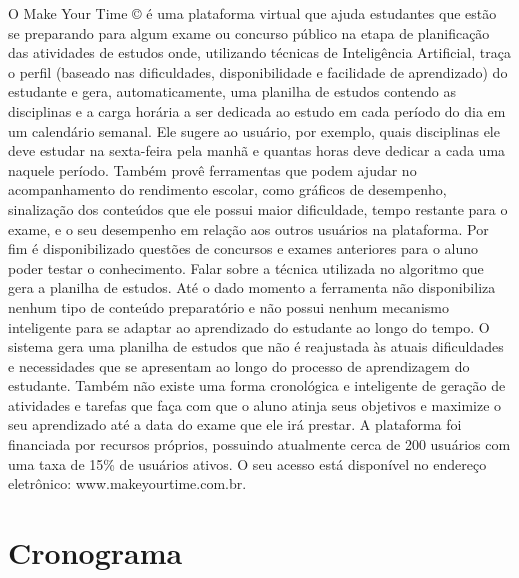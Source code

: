 \documentclass[
12pt,				%
oneside,			%
a4paper,			%
english,			%
brazil				%
]{abntex2ppgsi}
\begin{document}
O Make Your Time © é uma plataforma virtual que ajuda estudantes que estão se preparando para algum exame ou concurso público na etapa de planificação das atividades de estudos onde, utilizando técnicas de Inteligência Artificial, traça o perfil (baseado nas dificuldades, disponibilidade e facilidade de aprendizado) do estudante e gera, automaticamente, uma planilha de estudos contendo as disciplinas e a carga horária a ser dedicada ao estudo em cada período do dia em um calendário semanal. Ele sugere ao usuário, por exemplo, quais disciplinas ele deve estudar na sexta-feira pela manhã e quantas horas deve dedicar a cada uma naquele período. Também provê ferramentas que podem ajudar no acompanhamento do rendimento escolar, como gráficos de desempenho, sinalização dos conteúdos que ele possui maior dificuldade, tempo restante para o exame, e o seu desempenho em relação aos outros usuários na plataforma. Por fim é disponibilizado questões de concursos e exames anteriores para o aluno poder testar o conhecimento.
Falar sobre a técnica utilizada no algoritmo que gera a planilha de estudos.
Até o dado momento a ferramenta não disponibiliza nenhum tipo de conteúdo preparatório e não possui nenhum mecanismo inteligente para se adaptar ao aprendizado do estudante ao longo do tempo. O sistema gera uma planilha de estudos que não é reajustada às atuais dificuldades e necessidades que se apresentam ao longo do processo de aprendizagem do estudante. Também não existe uma forma cronológica e inteligente de geração de atividades e tarefas que faça com que o aluno atinja seus objetivos e maximize o seu aprendizado até a data do exame que ele irá prestar.
A plataforma foi financiada por recursos próprios, possuindo atualmente cerca de 200 usuários com uma taxa de 15\% de usuários ativos. O seu acesso está disponível no endereço eletrônico: www.makeyourtime.com.br. 

\chapter{Cronograma}


\postextual




\end{document}
